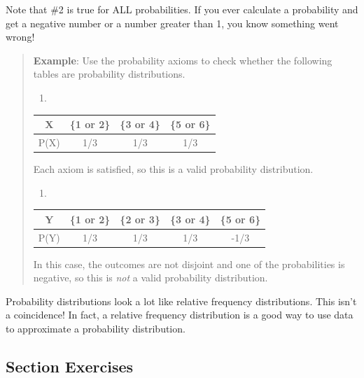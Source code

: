 \documentclass[
]{book}
\providecommand{\tightlist}{%
  \setlength{\itemsep}{0pt}\setlength{\parskip}{0pt}}
\begin{document}
Note that \#2 is true for ALL probabilities. If you ever calculate a probability and get a negative number or a number greater than 1, you know something went wrong!

\begin{quote}
\textbf{Example}: Use the probability axioms to check whether the following tables are probability distributions.

\begin{enumerate}
\def\labelenumi{\Alph{enumi})}
\tightlist
\item
\end{enumerate}

\begin{longtable}[]{@{}cccc@{}}
\toprule\noalign{}
X & \{1 or 2\} & \{3 or 4\} & \{5 or 6\} \\
\midrule\noalign{}
\endhead
\bottomrule\noalign{}
\endlastfoot
P(X) & 1/3 & 1/3 & 1/3 \\
\end{longtable}

Each axiom is satisfied, so this is a valid probability distribution.

\begin{enumerate}
\def\labelenumi{\Alph{enumi})}
\setcounter{enumi}{1}
\tightlist
\item
\end{enumerate}

\begin{longtable}[]{@{}ccccc@{}}
\toprule\noalign{}
Y & \{1 or 2\} & \{2 or 3\} & \{3 or 4\} & \{5 or 6\} \\
\midrule\noalign{}
\endhead
\bottomrule\noalign{}
\endlastfoot
P(Y) & 1/3 & 1/3 & 1/3 & -1/3 \\
\end{longtable}

In this case, the outcomes are not disjoint and one of the probabilities is negative, so this is \emph{not} a valid probability distribution.
\end{quote}

Probability distributions look a lot like relative frequency distributions. This isn't a coincidence! In fact, a relative frequency distribution is a good way to use data to approximate a probability distribution.

\subsection*{Section Exercises}\label{section-exercises-10}
\end{document}
